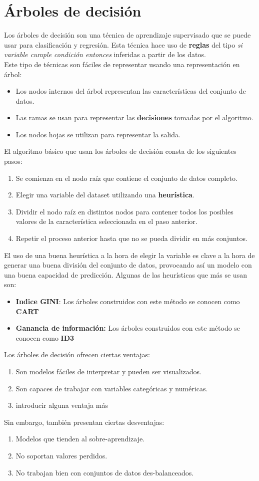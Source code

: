\section{Árboles de decisión}
\label{alg:dec_tree}
Los árboles de decisión son una técnica de aprendizaje supervisado que se puede usar para clasificación y regresión. Esta técnica hace uso de \textbf{reglas} del tipo \textit{si variable cumple condición entonces } inferidas a partir de los datos. \\
Este tipo de técnicas son fáciles de representar usando una representación en árbol:
\begin{itemize}
	 \item Los nodos internos del árbol representan las características del conjunto de datos.
	 \item Las ramas se usan para representar las \textbf{decisiones} tomadas por el algoritmo.
	 \item Los nodos hojas se utilizan para representar la salida.
\end{itemize}
El algoritmo básico que usan los árboles de decisión consta de los siguientes pasos:
\begin{enumerate}[1º]
	  \item Se comienza en el nodo raíz que contiene el conjunto de datos completo.
	  \item Elegir una variable del dataset utilizando una \textbf{heurística}.
	  \item Dividir el nodo raíz en distintos nodos para contener todos los posibles valores de la característica seleccionada en el paso anterior.
	  \item Repetir el proceso anterior hasta que no se pueda dividir en más conjuntos.
\end{enumerate}
El uso de una buena heurística a la hora de elegir la variable es clave a la hora de generar una buena división del conjunto de datos, provocando así un modelo con una buena capacidad de predicción. Algunas de las heurísticas que más se usan son:
\begin{itemize}
	\item \textbf{Indice GINI}: Los árboles construidos con este método se conocen como \textbf{CART}
	\item \textbf{Ganancia de información:} Los árboles construidos con este método se conocen como \textbf{ID3}
\end{itemize}
Los árboles de decisión ofrecen ciertas ventajas:
\begin{enumerate}
	\item Son modelos fáciles de interpretar y pueden ser visualizados.
	\item Son capaces de trabajar con variables categóricas y numéricas.
	\item introducir alguna ventaja más
\end{enumerate}
Sin embargo, también presentan ciertas desventajas:
\begin{enumerate}
	\item Modelos que tienden al sobre-aprendizaje.
	\item No soportan valores perdidos.
	\item No trabajan bien con conjuntos de datos des-balanceados.
\end{enumerate}
